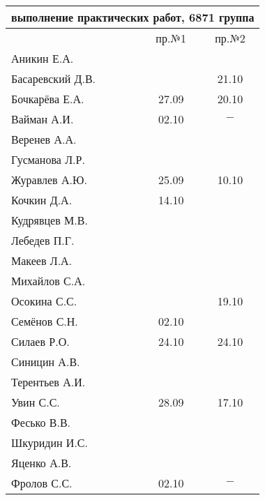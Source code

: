 \documentclass[a4paper,11pt]{article}
\begin{document}
\begin{tabular}{l|cc}
\multicolumn{3}{c}{выполнение практических работ, 6871 группа} \\
\toprule
& пр.№1 & пр.№2 \\
\midrule
Аникин Е.А.     &     &\\    
Басаревский Д.В.&     &21.10\\
Бочкарёва Е.А.  &27.09&20.10\\
Вайман А.И.     &02.10&$-$\\
Веренев А.А.    &     &\\
Гусманова Л.Р.  &     &\\
Журавлев А.Ю.   &25.09&10.10\\
Кочкин Д.А.     &14.10&\\
Кудрявцев М.В.  &     &\\
Лебедев П.Г.    &     &\\
Макеев Л.А.     &     &\\
Михайлов С.А.   &     &\\
Осокина С.С.    &     &19.10\\
Семёнов С.Н.    &02.10&\\
Силаев Р.О.     &24.10&24.10\\
Синицин А.В.    &     &\\
Терентьев А.И.  &     &\\
Увин С.С.       &28.09&17.10\\
Фесько В.В.     &     &\\
Шкуридин И.С.   &     &\\
Яценко А.В.     &     &\\
Фролов С.С.     &02.10&$-$\\
\bottomrule
\end{tabular}
\end{document}
